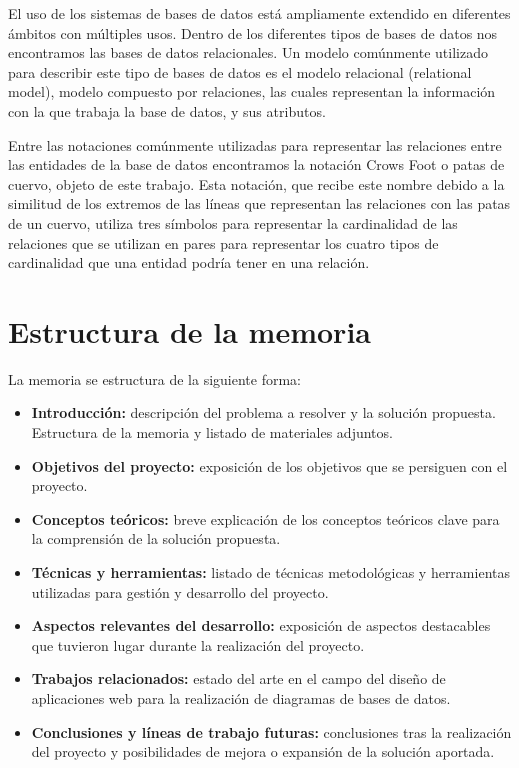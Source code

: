 
El uso de los sistemas de bases de datos está ampliamente extendido en diferentes ámbitos con múltiples usos. Dentro de los diferentes tipos de bases de datos nos encontramos las bases de datos relacionales\cite{wiki:relational_db}. Un modelo comúnmente utilizado para describir este tipo de bases de datos es el modelo relacional (relational model)\cite{wiki:relational_model}, modelo compuesto por relaciones, las cuales representan la información con la que trabaja la base de datos, y sus atributos.

Entre las notaciones comúnmente utilizadas para representar las relaciones entre las entidades de la base de datos encontramos la notación Crows Foot o patas de cuervo, objeto de este trabajo. Esta notación, que recibe este nombre debido a la similitud de los extremos de las líneas que representan las relaciones con las patas de un cuervo, utiliza tres símbolos para representar la cardinalidad de las relaciones que se utilizan en pares para representar los cuatro tipos de cardinalidad que una entidad podría tener en una relación.

\section{Estructura de la memoria}
La memoria se estructura de la siguiente forma:
\begin{itemize}
    \item \textbf{Introducción: } descripción del problema a resolver y la solución propuesta. Estructura de la memoria y listado de materiales adjuntos.
    \item \textbf{Objetivos del proyecto: } exposición de los objetivos que se persiguen con el proyecto.
    \item \textbf{Conceptos teóricos: }breve explicación de los conceptos teóricos clave para la comprensión de la solución propuesta.
    \item \textbf{Técnicas y herramientas: }listado de técnicas metodológicas y herramientas utilizadas para gestión y desarrollo del proyecto.
    \item \textbf{Aspectos relevantes del desarrollo: }exposición de aspectos destacables que tuvieron lugar durante la realización del proyecto.
    \item \textbf{Trabajos relacionados: }estado del arte en el campo del diseño de aplicaciones web para la realización de diagramas de bases de datos.
    \item \textbf{Conclusiones y líneas de trabajo futuras: }conclusiones tras la realización del proyecto y posibilidades de mejora o expansión de la solución aportada.
\end{itemize}

